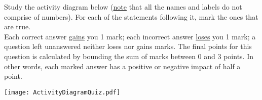 
\pgfmathsetmacro{}

 Study the activity diagram below (\underline{note} that all the names and labels do not comprise of numbers).  For each of the statements following it, mark the ones that are true.
\\Each correct answer \underline{gains} you 1 mark; each incorrect answer \underline{loses} you 1 mark; a question left unanswered neither loses nor gains marks. The final points for this question is calculated by bounding the sum of marks between 0 and 3 points. In other words, each marked answer has a positive or negative impact of half a point.

\begin{center}
	\texttt{[image: ActivityDiagramQuiz.pdf]}
\end{center}


\ifx\questionEightAnswerA\undefined\else{}\fi
\ifx\questionEightAnswerA\undefined\else{}\fi
\ifx\questionEightAnswerA\undefined\else{}\fi
\ifx\questionEightAnswerB\undefined\else{}\fi
\ifx\questionEightAnswerB\undefined\else{}\fi
\ifx\questionEightAnswerB\undefined\else{}\fi
\ifx\questionEightAnswerC\undefined\else{}\fi
\ifx\questionEightAnswerC\undefined\else{}\fi
\ifx\questionEightAnswerC\undefined\else{}\fi
\ifx\questionEightAnswerD\undefined\else{}\fi
\ifx\questionEightAnswerD\undefined\else{}\fi
\ifx\questionEightAnswerD\undefined\else{}\fi
\ifx\questionEightAnswerE\undefined\else{}\fi
\ifx\questionEightAnswerE\undefined\else{}\fi
\ifx\questionEightAnswerE\undefined\else{}\fi
\ifx\questionEightAnswerF\undefined\else{}\fi
\ifx\questionEightAnswerF\undefined\else{}\fi
\ifx\questionEightAnswerF\undefined\else{}\fi


